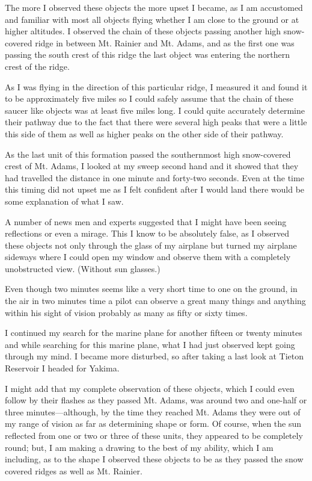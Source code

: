 \begin{svgraybox}
      The more I observed these objects the more upset I became, as I am accustomed and familiar with most all objects flying whether I am close
to the ground or at higher altitudes. I observed the chain of these objects passing another high snow-covered ridge in between Mt. Rainier and Mt. Adams,
      and as the first one was passing the south crest of this ridge the last object was entering the northern crest of the ridge.

      As I was flying in the direction of this particular ridge, I measured it and found it to be approximately five miles so I could safely assume that the chain of these saucer like objects was at least five miles long. I could quite accurately determine their pathway due to the fact that there were several high peaks that were a little this side of them as well as higher peaks on the other side of their pathway.

      As the last unit of this formation passed the southernmost high snow-covered crest of Mt. Adams, I looked at my sweep second hand and it showed that they had travelled the distance in one minute and forty-two seconds. Even at the time this timing did not upset me as I felt confident after I would land there would be some explanation of what I saw.

      A number of news men and experts suggested that I might have been seeing reflections or even a mirage. This I know to be absolutely false, as I observed these objects not only through the glass of my airplane but turned my airplane sideways where I could open my window and observe them with a completely unobstructed view. (Without sun glasses.)

      Even though two minutes seems like a very short time to one on the ground, in the air in two minutes time a pilot can observe a great many things and anything within his sight of vision probably as many as fifty or sixty times.

      I continued my search for the marine plane for another fifteen or twenty minutes and while searching for this marine plane, what I had just observed kept going through my mind. I became more disturbed, so after taking a last look at Tieton Reservoir I headed for Yakima.

      I might add that my complete observation of these objects, which I could even follow by their flashes as they passed Mt. Adams, was around two
      and one-half or three minutes---although, by the time they reached Mt. Adams they were out of my range of vision as far as determining shape or form. Of course, when the sun reflected from one or two or three of these units, they appeared to be completely round; but, I am making a drawing to the best of my ability, which I am including, as to the shape I observed these objects to be as they passed the snow covered ridges as well as Mt. Rainier.


\end{svgraybox}
